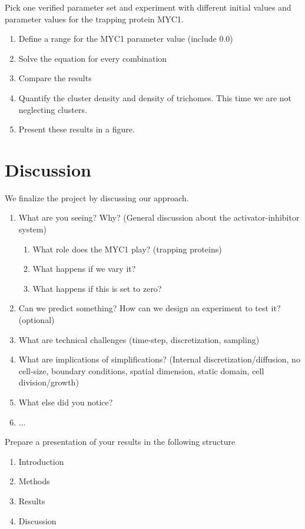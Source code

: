 %
%
Pick one verified parameter set and experiment with different initial values and parameter values for the trapping protein MYC1.
\begin{enumerate}
    \item Define a range for the MYC1 parameter value (include $0.0$)
    \item Solve the equation for every combination
    \item Compare the results
    \item Quantify the cluster density and density of trichomes.
    This time we are not neglecting clusters.
    \item Present these results in a figure.
\end{enumerate}
%
%
\section{Discussion}
We finalize the project by discussing our approach.
\begin{enumerate}
    \item What are you seeing? Why? (General discussion about the activator-inhibitor system)
    \begin{enumerate}
        \item What role does the MYC1 play? (trapping proteins)
        \item What happens if we vary it?
        \item What happens if this is set to zero?
    \end{enumerate}
    \item Can we predict something? How can we design an experiment to test it? (optional)
    \item What are technical challenges (time-step, discretization, sampling)
    \item What are implications of simplifications? (Internal discretization/diffusion, no cell-size, boundary conditions, spatial dimension, static domain, cell division/growth)
    \item What else did you notice?
    \item ...
\end{enumerate}
%
%
Prepare a presentation of your results in the following structure
\begin{enumerate}
    \item Introduction
    \item Methods
    \item Results
    \item Discussion
\end{enumerate}